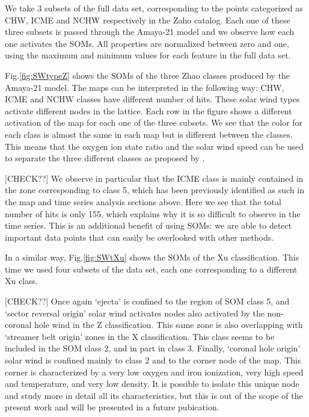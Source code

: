 We take 3 subsets of the full data set, corresponding to the points categorized as CHW, ICME and NCHW respectively in the Zaho catalog. Each one of these three subsets is passed through the Amaya-21 model and we observe how each one activates the SOMs. All properties are normalized between zero and one, using the maximum and minimum values for each feature in the full data set.

Fig.\ref{fig:SWtypeZ} shows the SOMs of the three Zhao classes produced by the Amaya-21 model. The maps can be interpreted in the following way: CHW, ICME and NCHW classes have different number of hits. These solar wind types activate different nodes in the lattice. Each row in the figure shows a different activation of the map for each one of the three subsets. We see that the color for each class is almost the same in each map but is different between the classes. This means that the oxygen ion state ratio and the solar wind speed can be used to separate the three different classes as proposed by \citep{Zhao2009}.

[CHECK??] We observe in particular that the ICME class is mainly contained in the zone corresponding to class 5, which has been previously identified as such in the map and time series analysis sections above. Here we see that the total number of hits is only 155, which explains why it is so difficult to observe in the time series. This is an additional benefit of using SOMs: we are able to detect important data points that can easily be overlooked with other methods.

In a similar way, Fig.\ref{fig:SWtXu} shows the SOMs of the Xu classification. This time we used four subsets of the data set, each one corresponding to a different Xu class. 

[CHECK??] Once again `ejecta' is confined to the region of SOM class 5, and `sector reversal origin' solar wind activates nodes also activated by the non-coronal hole wind in the Z classification. This same zone is also overlapping with `streamer belt origin' zones in the X classification. This class seems to be included in the SOM class 2, and in part in class 3. Finally, `coronal hole origin' solar wind is confined mainly to class 2 and to the corner node of the map. This corner is characterized by a very low oxygen and iron ionization, very high speed and temperature, and very low density. It is possible to isolate this unique node and study more in detail all its characteristics, but this is out of the scope of the present work and will be presented in a future pubication.

